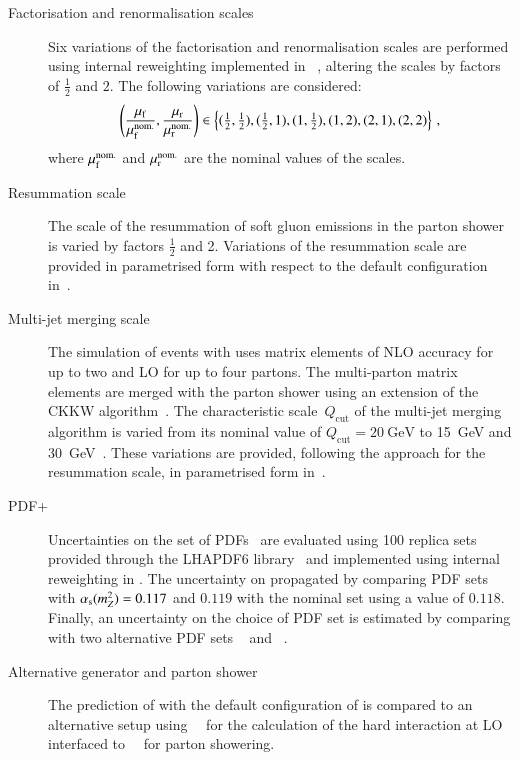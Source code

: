 \begin{description}

\item[Factorisation and renormalisation scales] Six variations of the
  factorisation and renormalisation scales are performed using
  internal reweighting implemented in
  \SHERPA[2.2.1]~\cite{Bothmann:2019yzt}, altering the scales by
  factors of $\frac{1}{2}$ and $2$. The following variations are
  considered:
  \begin{align*}
    \left( \frac{\mu_\mathrm{f}}{\mu_\mathrm{f}^{\text{nom.}}}, \frac{\mu_\mathrm{r}}{\mu_\mathrm{r}^{\text{nom.}}} \right) \in
    \left\{ (\tfrac{1}{2}, \tfrac{1}{2}), (\tfrac{1}{2}, 1), (1, \tfrac{1}{2}), (1, 2), (2, 1), (2, 2) \right\} \,\text{,}
  \end{align*}
  where $\mu_\mathrm{f}^{\text{nom.}}$ and $\mu_\mathrm{r}^{\text{nom.}}$ are the nominal
  values of the scales.

\item[Resummation scale] The scale of the resummation of soft gluon
  emissions in the \SHERPA parton shower is varied by factors
  $\frac{1}{2}$ and 2. Variations of the resummation scale are
  provided in parametrised form with respect to the default \SHERPA
  configuration in~\cite{anders:2017}.

\item[Multi-jet merging scale] The simulation of \Zjets events with
  \SHERPA[2.2.1] uses matrix elements of NLO accuracy for up to two
  and LO for up to four partons. The multi-parton matrix elements are
  merged with the parton shower using an extension of the CKKW
  algorithm~\cite{Catani:2001cc,Hoeche:2009rj,Hoeche:2012yf}. The
  characteristic scale~$Q_{\text{cut}}$ of the multi-jet merging
  algorithm is varied from its nominal value of
  $Q_{\text{cut}} = \SI{20}{\GeV}$ to \SI{15}{\GeV} and
  \SI{30}{\GeV}~\cite{anders:2017}. These variations are provided,
  following the approach for the resummation scale, in parametrised
  form in~\cite{anders:2017}.

\item[PDF+\alphas] Uncertainties on the \NNPDF[3.0nnlo] set of
  PDFs~\cite{Ball:2014uwa} are evaluated using 100 replica sets
  provided through the \textsc{LHAPDF6} library~\cite{Buckley:2014ana}
  and implemented using internal reweighting in \SHERPA. The
  uncertainty on \alphas propagated by comparing \NNPDF[3.0nnlo] PDF
  sets with $\alpha_{\text{s}}(m_{Z}^2) = 0.117$ and $0.119$ with the nominal set
  using a value of $0.118$. Finally, an uncertainty on the choice of
  PDF set is estimated by comparing with two alternative PDF sets
  \MMHT[nnlo68cl]~\cite{Harland-Lang:2014zoa} and
  \CT[14nnlo]~\cite{Dulat:2015mca}.

\item[Alternative generator and parton shower] The prediction of
  \Zjets with the default configuration of \SHERPA[2.2.1] is compared
  to an alternative setup using~\MGNLO[2.2.2]~\cite{Alwall:2014hca}
  for the calculation of the hard interaction at LO interfaced
  to~\PYTHIA[8.186]~\cite{Sjostrand:2007gs} for parton showering.

\end{description}
